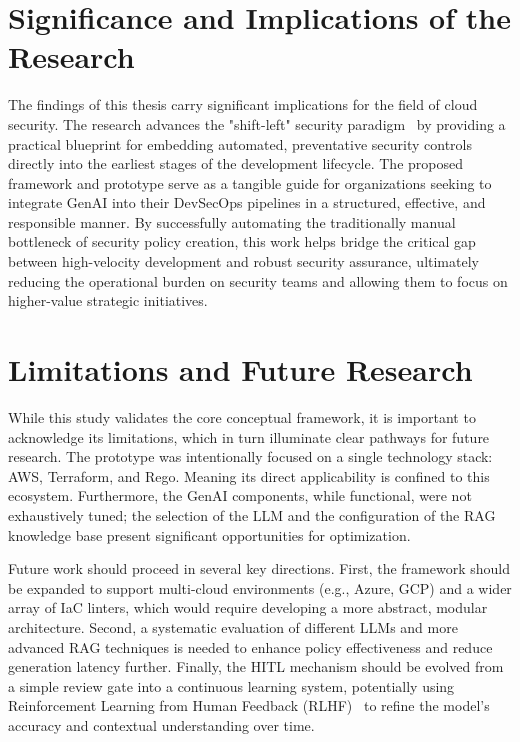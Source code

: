 \section{Significance and Implications of the Research}

The findings of this thesis carry significant implications for the field of cloud security. The research advances the "shift-left" security paradigm~\cite{akto_shift_2025} by providing a practical blueprint for embedding automated, preventative security controls directly into the earliest stages of the development lifecycle. The proposed framework and prototype serve as a tangible guide for organizations seeking to integrate GenAI into their DevSecOps pipelines in a structured, effective, and responsible manner. By successfully automating the traditionally manual bottleneck of security policy creation, this work helps bridge the critical gap between high-velocity development and robust security assurance, ultimately reducing the operational burden on security teams and allowing them to focus on higher-value strategic initiatives.

\section{Limitations and Future Research}

While this study validates the core conceptual framework, it is important to acknowledge its limitations, which in turn illuminate clear pathways for future research. The prototype was intentionally focused on a single technology stack: AWS, Terraform, and Rego. Meaning its direct applicability is confined to this ecosystem. Furthermore, the GenAI components, while functional, were not exhaustively tuned; the selection of the LLM and the configuration of the RAG knowledge base present significant opportunities for optimization.

Future work should proceed in several key directions. First, the framework should be expanded to support multi-cloud environments (e.g., Azure, GCP) and a wider array of IaC linters, which would require developing a more abstract, modular architecture. Second, a systematic evaluation of different LLMs and more advanced RAG techniques is needed to enhance policy effectiveness and reduce generation latency further. Finally, the HITL mechanism should be evolved from a simple review gate into a continuous learning system, potentially using Reinforcement Learning from Human Feedback (RLHF)~\cite{ouyang_training_2022} to refine the model's accuracy and contextual understanding over time.

